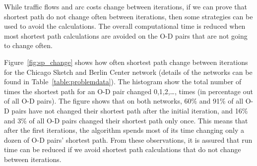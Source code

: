 While traffic flows and arc costs change between iterations,
if we can prove that shortest path do not change often between iterations,
then some strategies can be used to avoid the calculations.
The overall computational time is reduced when most shortest path calculations are avoided on the O-D pairs that are not going to change often.

Figure~\ref{fig:sp_change} shows how often shortest path change between iterations for the Chicago Sketch and Berlin Center network (details of the networks can be found in Table~\ref{table:problemdata}).
The histogram show the total number of times the shortest path for an O-D pair changed 0,1,2,\ldots, times (in percentage out of all O-D pairs).
The figure shows that on both networks, 60\% and 91\% of all O-D pairs have not changed their shortest path after the initial iteration,
and 16\% and 3\% of all O-D pairs changed their shortest path only once.
This means that after the first iterations,
the algorithm spends most of its time changing only a dozen of O-D pairs' shortest path.
From these observations,
it is assured that run time can be reduced if we avoid shortest path calculations that do not change between iterations.

